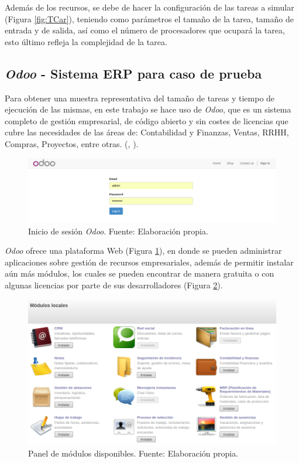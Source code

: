 Adem\'as de los recursos, se debe de hacer la configuraci\'on de las tareas a simular (Figura \ref{fig:TCar}), teniendo como par\'ametros el tamaño de la tarea, tamaño de entrada y de salida, as\'i como el número de procesadores que ocupar\'a la tarea, esto \'ultimo refleja la complejidad de la tarea.

\subsection*{\textit{Odoo} - Sistema ERP para caso de prueba}

Para obtener una muestra representativa del tamaño de tareas y tiempo de ejecución de las mismas, en este trabajo se hace uso de \textit{Odoo}, que es un sistema completo de gestión empresarial, de código abierto y sin costes de licencias que cubre las necesidades de las áreas de: Contabilidad y Finanzas, Ventas, RRHH, Compras, Proyectos, entre otras. (\citeauthor{odooWiki}, \citeyear{odooWiki}).

\renewcommand\thefigure{\arabic{figure}}
\begin{figure}[h!]
	\centering
	\includegraphics[scale=0.3]{media/odoo/1}
	\caption{Inicio de sesión \textit{Odoo}. Fuente: Elaboración propia.}
	\label{fig:loginOdoo}
\end{figure}


\textit{Odoo} ofrece una plataforma Web (Figura \ref{fig:loginOdoo}), en donde se pueden administrar aplicaciones sobre gestión de recursos empresariales, además de permitir instalar aún más módulos, los cuales se pueden encontrar de manera gratuita o con algunas licencias por parte de sus desarrolladores (Figura \ref{fig:OdooApps}).

\renewcommand\thefigure{\arabic{figure}}
\begin{figure}[h!]
	\centering
	\includegraphics[scale=0.3]{media/odoo/2}
	\caption{Panel de módulos disponibles. Fuente: Elaboración propia.}
	\label{fig:OdooApps}
\end{figure}

